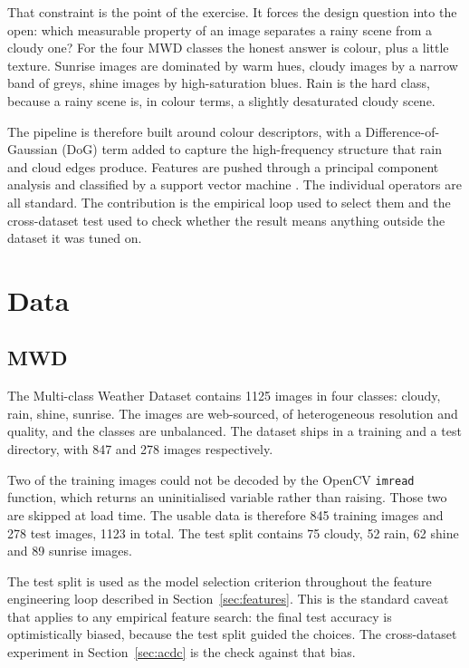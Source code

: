 \documentclass[10pt, conference, letterpaper]{IEEEtran}
\begin{document}
That constraint is the point of the exercise. It forces the design question into the open: which measurable property of an image separates a rainy scene from a cloudy one? For the four MWD classes the honest answer is colour, plus a little texture. Sunrise images are dominated by warm hues, cloudy images by a narrow band of greys, shine images by high-saturation blues. Rain is the hard class, because a rainy scene is, in colour terms, a slightly desaturated cloudy scene.

The pipeline is therefore built around colour descriptors, with a Difference-of-Gaussian (DoG) term added to capture the high-frequency structure that rain and cloud edges produce. Features are pushed through a principal component analysis and classified by a support vector machine \cite{cortes1995svm}. The individual operators are all standard. The contribution is the empirical loop used to select them and the cross-dataset test used to check whether the result means anything outside the dataset it was tuned on.

\section{Data}

\subsection{MWD}

The Multi-class Weather Dataset \cite{ajayi2018mwd} contains 1125 images in four classes: cloudy, rain, shine, sunrise. The images are web-sourced, of heterogeneous resolution and quality, and the classes are unbalanced. The dataset ships in a training and a test directory, with 847 and 278 images respectively.

Two of the training images could not be decoded by the OpenCV \cite{bradski2000opencv} \texttt{imread} function, which returns an uninitialised variable rather than raising. Those two are skipped at load time. The usable data is therefore 845 training images and 278 test images, 1123 in total. The test split contains 75 cloudy, 52 rain, 62 shine and 89 sunrise images.

The test split is used as the model selection criterion throughout the feature engineering loop described in Section~\ref{sec:features}. This is the standard caveat that applies to any empirical feature search: the final test accuracy is optimistically biased, because the test split guided the choices. The cross-dataset experiment in Section~\ref{sec:acdc} is the check against that bias.
\end{document}
